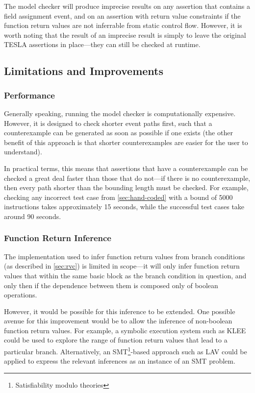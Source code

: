 The model checker will produce imprecise results on any assertion that
contains a field assignment event, and on an assertion with return value
constraints if the function return values are not inferrable from static
control flow. However, it is worth noting that the result of an
imprecise result is simply to leave the original TESLA assertions in
place---they can still be checked at runtime.

\subsection{Limitations and Improvements} \label{sec:model-limits}

\subsubsection{Performance}

Generally speaking, running the model checker is computationally
expensive. However, it is designed to check shorter event paths first,
such that a counterexample can be generated as soon as possible if one
exists (the other benefit of this approach is that shorter
counterexamples are easier for the user to understand).

In practical terms, this means that assertions that have a
counterexample can be checked a great deal faster than those that do
not---if there is no counterexample, then every path shorter than the
bounding length must be checked. For example, checking any incorrect
test case from \autoref{sec:hand-coded} with a bound of 5000
instructions takes approximately 15 seconds, while the successful test
cases take around 90 seconds.

\subsubsection{Function Return Inference}

The implementation used to infer function return values from branch
conditions (as described in \autoref{sec:rvc}) is limited in scope---it
will only infer function return values that within the same basic block
as the branch condition in question, and only then if the dependence
between them is composed only of boolean operations.

However, it would be possible for this inference to be extended. One
possible avenue for this improvement would be to allow the inference of
non-boolean function return values. For example, a symbolic execution
system such as KLEE \cite{cadar_klee:_2008} could be used to explore the
range of function return values that lead to a particular branch.
Alternatively, an SMT\footnote{Satisfiability modulo theories}-based
approach such as LAV \cite{vujosevic-janicic_development_2012} could be
applied to express the relevant inferences as an instance of an SMT
problem.

